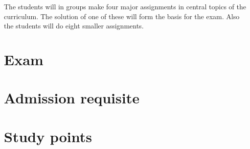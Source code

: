 \documentclass[12pt,a4paper,final]{article}
\begin{document}
The students will in groups make four major assignments in central topics of the curriculum. The solution of one of these will form the basis for the exam.
Also the students will do eight smaller assignments.

\section*{Exam}



\section*{Admission requisite}



\section*{Study points}


\end{document}

